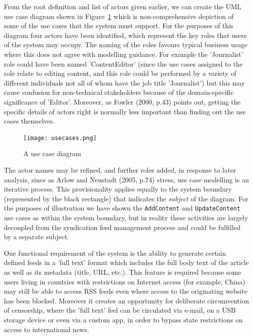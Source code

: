 \documentclass{article}
\begin{document}
From the root definition and list of actors given earlier, we can create the UML use case diagram shown in Figure~\ref{use-cases} which is non-comprehensive depiction of some of the use cases that the system must support. For the purposes of this diagram four actors have been identified, which represent the key roles that users of the system may occupy. The naming of the roles favours typical business usage where this does not agree with modelling guidance. For example the 'Journalist' role could have been named 'ContentEditor' (since the use cases assigned to the role relate to editing content, and this role could be performed by a variety of different individuals not all of whom have the job title 'Journalist') but this may cause confusion for non-technical stakeholders because of the domain-specific significance of 'Editor'. Moreover, as Fowler (2000, p.43) points out, getting the specific details of actors right is normally less important than finding out the use cases themselves.

\begin{figure}
  \texttt{[image: usecases.png]}
  \caption{A use case diagram}
  \label{use-cases}
\end{figure}


The actor names may be refined, and further roles added, in response to later analysis, since as Arlow and Neustadt (2005, p.74) stress, use case modelling is an iterative process. This provisionality applies equally to the system boundary (represented by the black rectangle) that indicates the \textit{subject} of the diagram. For the purposes of illustration we have shown the \texttt{AddContent} and \texttt{UpdateContent} use cases as within the system boundary, but in reality these activities are largely decoupled from the syndication feed management process and could be fulfilled by a separate subject.

One functional requirement of the system is the ability to generate certain defined feeds in a 'full text' format which includes the full body text of the article as well as its metadata (title, URL, etc.). This feature is required because some users living in countries with restrictions on Internet access (for example, China) may still be able to access RSS feeds even where access to the originating website has been blocked. Moreover it creates an opportunity for deliberate circumvention of censorship, where the 'full text' feel can be circulated via e-mail, on a USB storage device or even via a custom app, in order to bypass state restrictions on access to international news.
\end{document}
